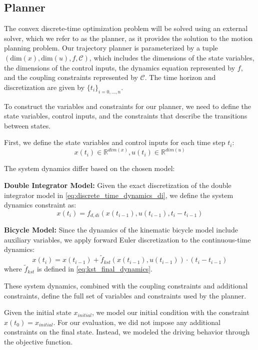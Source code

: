 \subsection{Planner}

The convex discrete-time optimization problem will be solved using an external solver, which we refer to as the planner, as it provides the solution
to the motion planning problem.
Our trajectory planner is parameterized by a tuple $(\text{dim}(x), \text{dim}(u), f, \mathcal{C})$, which includes the dimensions of the state
variables, the dimensions of the control inputs, the dynamics equation represented by $f$, and the coupling constraints represented by $\mathcal{C}$.
The time horizon and discretization are given by $\{t_i\}_{i=0,\dots,n}$.

To construct the variables and constraints for our planner, we need to define the state variables, control inputs, and the constraints that describe
the transitions between states.

First, we define the state variables and control inputs for each time step $t_i$:
\begin{equation}
	x(t_i) \in \mathbb{R}^{dim(x)}, u(t_i) \in \mathbb{R}^{dim(u)}
\end{equation}

The system dynamics differ based on the chosen model:

\textbf{Double Integrator Model:} Given the exact discretization of the double integrator
model in \eqref{eq:discrete_time_dynamics_di}, we define the system dynamics constraint as:
\begin{equation}
	x(t_i) = f_{d,di}(x(t_{i-1}), u(t_{i-1}), t_i - t_{i-1})
\end{equation}

\textbf{Bicycle Model:}
Since the dynamics of the kinematic bicycle model include auxiliary variables, we apply forward Euler discretization to the continuous-time dynamics:
\begin{equation}
	x(t_i) = x(t_{i-1}) + \tilde{f}_{kst}(x(t_{i-1}), u(t_{i-1})) \cdot (t_i - t_{i-1})
\end{equation}
where $\tilde{f}_{kst}$ is defined in \eqref{eq:kst_final_dynamics}.

These system dynamics, combined with the coupling constraints and additional constraints, define the full set of variables and constraints used by
the planner.

Given the initial state $x_{initial}$, we model our initial condition with the constraint $x(t_0) = x_{initial}$.
For our evaluation, we did not impose any additional constraints on the final state.
Instead, we modeled the driving behavior through the objective function.

